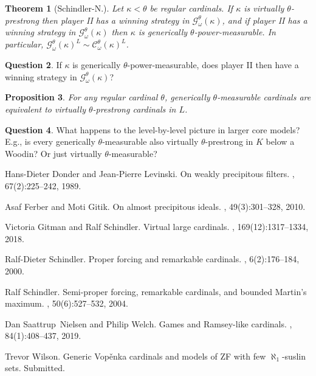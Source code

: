 \documentclass{amsart}
\newtheorem{theorem}{Theorem}[section]
\newtheorem{proposition}[theorem]{Proposition}
\theoremstyle{definition}
\newtheorem{question}[theorem]{Question}
\newcommand{\C}{\mathcal C}
\newcommand{\G}{\mathcal G}
\begin{document}
\begin{theorem}[Schindler-N.]
  Let $\kappa<\theta$ be regular cardinals. If $\kappa$ is virtually $\theta$-prestrong then player II has a winning strategy in $\G^\theta_\omega(\kappa)$, and if player II has a winning strategy in $\G_\omega^\theta(\kappa)$ then $\kappa$ is generically $\theta$-power-measurable. In particular, $\G^\theta_\omega(\kappa)^L\sim\C^\theta_\omega(\kappa)^L$.
\end{theorem}

\begin{question} 
If $\kappa$ is generically $\theta$-power-measurable, does player II then have a winning strategy in $\mathcal{G}^\theta_\omega(\kappa)$? 
\end{question} 

\begin{proposition}
  For any regular cardinal $\theta$, generically $\theta$-measurable cardinals are equivalent to virtually $\theta$-prestrong cardinals in $L$.
\end{proposition}

\begin{question} 
What happens to the level-by-level picture in larger core models? E.g., is every generically $\theta$-measurable also virtually $\theta$-prestrong in $K$ below a Woodin? Or just virtually $\theta$-measurable?
\end{question} 

%
%

\begin{thebibliography}{SNW19}

Hans-Dieter Donder and Jean-Pierre Levinski.
\newblock On weakly precipitous filters.
, 67(2):225--242, 1989.

Asaf Ferber and Moti Gitik.
\newblock On almost precipitous ideals.
, 49(3):301--328, 2010.

Victoria Gitman and Ralf Schindler.
\newblock Virtual large cardinals.
, 169(12):1317--1334, 2018.

Ralf-Dieter Schindler.
\newblock Proper forcing and remarkable cardinals.
, 6(2):176--184, 2000.

Ralf Schindler.
\newblock Semi-proper forcing, remarkable cardinals, and bounded {M}artin's
  maximum.
, 50(6):527--532, 2004.

Dan Saattrup~Nielsen and Philip Welch.
\newblock Games and {R}amsey-like cardinals.
, 84(1):408--437, 2019.

Trevor Wilson.
\newblock Generic {V}op\v enka cardinals and models of {ZF} with few
  {$\aleph_1$}-suslin sets.
\newblock Submitted.

\end{thebibliography}
\end{document}
